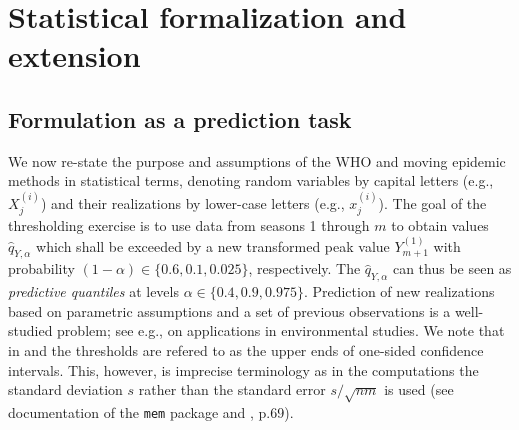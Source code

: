 \documentclass[12pt]{article}
\newcommand{\sd}{s}
\begin{document}
 
%
%



\section{Statistical formalization and extension}
\label{sec:formalization_extension}

\subsection{Formulation as a prediction task}
\label{subsec:reformulation}

We now re-state the purpose and assumptions of the WHO and moving epidemic methods in statistical terms, denoting random variables by capital letters (e.g., $X_j^{(i)}$) and their realizations by lower-case letters (e.g., $x_j^{(i)}$). The goal of the thresholding exercise is to use data from seasons 1 through $m$ to obtain values $\hat{q}_{Y, \alpha}$ which shall be exceeded by a new transformed peak value $Y_{m + 1}^{(1)}$ with probability $(1 - \alpha) \in \{0.6, 0.1, 0.025\}$, respectively. The $\hat{q}_{Y, \alpha}$ can thus be seen as \textit{predictive quantiles} at levels $\alpha \in \{0.4, 0.9, 0.975\}$. Prediction of new realizations based on parametric assumptions and a set of previous observations is a well-studied problem; see e.g., \cite{Millard2013} on applications in environmental studies. We note that in \cite{WHO2014} and \cite{Vega2015} the thresholds are refered to as the upper ends of one-sided confidence intervals. This, however, is imprecise terminology as in the computations the standard deviation $\sd$ rather than the standard error $\sd/\sqrt{nm}$ is used (see documentation of the \texttt{mem} package and \citealt{WHO2014}, p.69).
\end{document}
